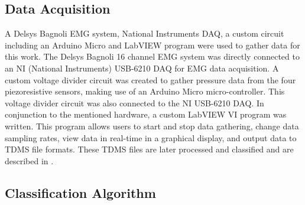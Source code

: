 \documentclass[twocolumn]{sagej}
\begin{document}
\begin{comment}
\begin{figure}[htbp]
\centering
\subfigure[]{\epsfig{figure=shoulder_down.png,height=1.5in}
\label{fig:arm_down}}
\subfigure[]{\epsfig{figure=shoulder_up2.png,height=1.62in}
\label{fig:arm_up}}
\subfigure[]{\epsfig{figure=shoulder_to_side.png,height=1.55in}
\label{fig:arm_out}}
\subfigure[]{\epsfig{figure=shoulder_across.png,height=1.55in}
\label{fig:arm_across}}
\caption{a) Arm 45 degrees shoulder flexion in the sagital plane (the hand approximately at waist-level) b) Arm 135 degrees of shoulder flexion in the sagittal plane (hand at approximately head-level) c) Arm out, away from the body (90 degrees abduction) d) Arm laterally across the body (adduction)}

\end{figure}
\end{comment}

\subsection*{Data Acquisition}
\label{sec:daq}

A Delsys Bagnoli EMG system, National Instruments DAQ, a custom circuit including an Arduino Micro and LabVIEW program were used to gather data for this work.  The Delsys Bagnoli 16 channel EMG system was directly connected to an NI (National Instruments) USB-6210 DAQ for EMG data acquisition.  A custom voltage divider circuit was created to gather pressure data from the four piezoresistive sensors, making use of an Arduino Micro micro-controller.  This voltage divider circuit was also connected to the NI USB-6210 DAQ. In conjunction to the mentioned hardware, a custom LabVIEW VI program was written.  This program allows users to start and stop data gathering, change data sampling rates, view data in real-time in a graphical display, and output data to TDMS file formats.  These TDMS files are later processed and classified and are described in \textit{}.

\subsection*{Classification Algorithm}
\label{sec:classifier}
\end{document}
